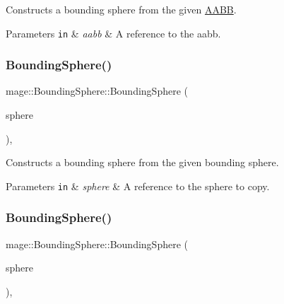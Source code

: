 Constructs a bounding sphere from the given \hyperlink{classmage_1_1_a_a_b_b}{A\+A\+BB}.


\begin{DoxyParams}[1]{Parameters}
\mbox{\tt in}  & {\em aabb} & A reference to the aabb. \\
\hline
\end{DoxyParams}
\hypertarget{classmage_1_1_bounding_sphere_aadd1c7613e09ad807d8a877c8b0906ac}{}\label{classmage_1_1_bounding_sphere_aadd1c7613e09ad807d8a877c8b0906ac} 
\subsubsection{\texorpdfstring{Bounding\+Sphere()}{BoundingSphere()}\hspace{0.1cm}{\footnotesize\ttfamily [7/8]}}
{\footnotesize\ttfamily mage\+::\+Bounding\+Sphere\+::\+Bounding\+Sphere (\begin{DoxyParamCaption}\item[{const \hyperlink{classmage_1_1_bounding_sphere}{Bounding\+Sphere} \&}]{sphere }\end{DoxyParamCaption})\hspace{0.3cm}{\ttfamily [default]}, {\ttfamily [noexcept]}}

Constructs a bounding sphere from the given bounding sphere.


\begin{DoxyParams}[1]{Parameters}
\mbox{\tt in}  & {\em sphere} & A reference to the sphere to copy. \\
\hline
\end{DoxyParams}
\hypertarget{classmage_1_1_bounding_sphere_a566985b59dd05cc4545c41183338a275}{}\label{classmage_1_1_bounding_sphere_a566985b59dd05cc4545c41183338a275} 
\subsubsection{\texorpdfstring{Bounding\+Sphere()}{BoundingSphere()}\hspace{0.1cm}{\footnotesize\ttfamily [8/8]}}
{\footnotesize\ttfamily mage\+::\+Bounding\+Sphere\+::\+Bounding\+Sphere (\begin{DoxyParamCaption}\item[{\hyperlink{classmage_1_1_bounding_sphere}{Bounding\+Sphere} \&\&}]{sphere }\end{DoxyParamCaption})\hspace{0.3cm}{\ttfamily [default]}, {\ttfamily [noexcept]}}

